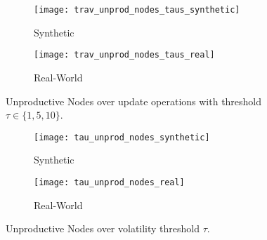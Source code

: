 \documentclass[abstracton,12pt]{scrartcl}
\theoremstyle{definition}
\begin{document}


\begin{figure}[h]
  \centering
   \begin{subfigure}{0.49\linewidth}
    \centering
    \caption{Synthetic}
    \texttt{[image: trav\_unprod\_nodes\_taus\_synthetic]}
    \label{fig:trav_unprod_nodes_taus_synthetic}
  \end{subfigure}
  \begin{subfigure}{0.49\linewidth}
    \centering
    \caption{Real-World}
    \texttt{[image: trav\_unprod\_nodes\_taus\_real]}
    \label{fig:trav_unprod_nodes_taus_real}
  \end{subfigure}
  \vspace{-0.5cm}
  \caption{Unproductive Nodes over update operations with threshold $\tau \in \{1,5,10\}$.}
\end{figure}

\begin{figure}[h]
  \centering
  \begin{subfigure}{0.49\linewidth}
    \centering
    \caption{Synthetic}
    \texttt{[image: tau\_unprod\_nodes\_synthetic]}
    \label{fig:tau_unprod_nodes_synthetic}
  \end{subfigure}
  \begin{subfigure}{0.49\linewidth}
    \centering
    \caption{Real-World}
    \texttt{[image: tau\_unprod\_nodes\_real]}
    \label{fig:tau_unprod_nodes_real}
  \end{subfigure}
  \vspace{-0.5cm}
  \caption{Unproductive Nodes over volatility threshold $\tau$.}
\end{figure}
\end{document}
